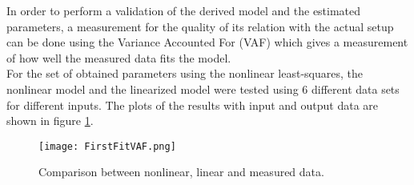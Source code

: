 \documentclass[main.tex]{subfiles}
\begin{document}
	
\vspace{20pt}

In order to perform a validation of the derived model and the estimated parameters, a measurement for the quality of its relation with the actual setup can be done using the Variance Accounted For (VAF)\cite{Filtering} which gives a measurement of how well the measured data fits the model. \\
For the set of obtained parameters using the nonlinear least-squares, the nonlinear model and the linearized model were tested using 6 different data sets for different inputs. The plots of the results with input and output data are shown in figure \ref{fig:VAF1}.

\begin{figure}[H]
\centering
\texttt{[image: FirstFitVAF.png]}
\caption{\label{fig:VAF1}Comparison between nonlinear, linear and measured data.}
\end{figure}
\end{document}
